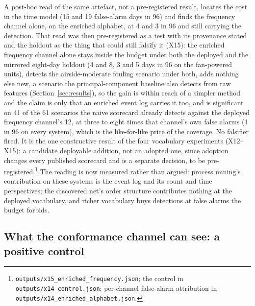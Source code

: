 \documentclass[11pt,letterpaper]{article}
\begin{document}
A post-hoc read of the same artefact, not a pre-registered result, locates the cost in the time model (15 and 19 false-alarm days in 96) and finds the frequency channel alone, on the enriched alphabet, at 4 and 3 in 96 and still carrying the detection. That read was then pre-registered as a test with its provenance stated and the holdout as the thing that could still falsify it (X15): the enriched frequency channel alone stays inside the budget under both the deployed and the mirrored eight-day holdout (4 and 8, 3 and 5 days in 96 on the fan-powered units), detects the airside-moderate fouling scenario under both, adds nothing else new, a scenario the principal-component baseline also detects from raw features (Section~\ref{sec:results}), so the gain is within reach of a simpler method and the claim is only that an enriched event log carries it too, and is significant on 41 of the 61 scenarios the naive scorecard already detects against the deployed frequency channel's 12, at three to eight times that channel's own false alarms (1 in 96 on every system), which is the like-for-like price of the coverage. No falsifier fired. It is the one constructive result of the four vocabulary experiments (X12--X15): a candidate deployable addition, not an adopted one, since adoption changes every published scorecard and is a separate decision, to be pre-registered.\footnote{\texttt{outputs/x15\_enriched\_frequency.json}; the control in \texttt{outputs/x14\_control.json}; per-channel false-alarm attribution in \texttt{outputs/x14\_enriched\_alphabet.json}.} The reading is now measured rather than argued: process mining's contribution on these systems is the event log and its count and time perspectives; the discovered net's order structure contributes nothing at the deployed vocabulary, and richer vocabulary buys detections at false alarms the budget forbids.

\subsection{What the conformance channel can see: a positive control}
\label{sec:positivecontrol}
\end{document}
